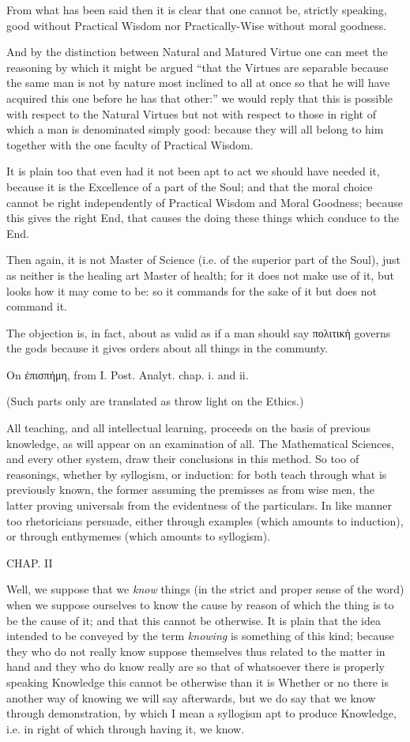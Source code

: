 From what has been said then it is clear that one cannot be, strictly speaking,
good without Practical Wisdom nor Practically-Wise without moral goodness.

And by the distinction between Natural and Matured Virtue one can meet the
reasoning by which it might be argued “that the Virtues are separable
because the same man is not by nature most inclined to all at once so that he
will have acquired this one before he has that other:” we would reply
that this is possible with respect to the Natural Virtues but not with respect
to those in right of which a man is denominated simply good: because they will
all belong to him together with the one faculty of Practical Wisdom.

It is plain too that even had it not been apt to act we should have needed it,
because it is the Excellence of a part of the Soul; and that the moral choice
cannot be right independently of Practical Wisdom and Moral Goodness; because
this gives the right End, that causes the doing these things which conduce to
the End.

Then again, it is not Master of Science (i.e. of the superior part of the
Soul), just as neither is the healing art Master of health; for it does not
make use of it, but looks how it may come to be: so it commands for the sake of
it but does not command it.

The objection is, in fact, about as valid as if a man should say
πολιτικὴ governs the gods because it
gives orders about all things in the communty.


On ἐπισπήμη, from I. Post. Analyt.
chap. i. and ii.

(Such parts only are translated as throw light on the Ethics.)

All teaching, and all intellectual learning, proceeds on the basis of previous
knowledge, as will appear on an examination of all. The Mathematical Sciences,
and every other system, draw their conclusions in this method. So too of
reasonings, whether by syllogism, or induction: for both teach through what is
previously known, the former assuming the premisses as from wise men, the
latter proving universals from the evidentness of the particulars. In like
manner too rhetoricians persuade, either through examples (which amounts to
induction), or through enthymemes (which amounts to syllogism).

CHAP. II

Well, we suppose that we \emph{know} things (in the strict and proper sense of
the word) when we suppose ourselves to know the cause by reason of which the
thing is to be the cause of it; and that this cannot be otherwise. It is plain
that the idea intended to be conveyed by the term \emph{knowing} is something
of this kind; because they who do not really know suppose themselves thus
related to the matter in hand and they who do know really are so that of
whatsoever there is properly speaking Knowledge this cannot be otherwise than
it is Whether or no there is another way of knowing we will say afterwards, but
we do say that we know through demonstration, by which I mean a syllogism apt
to produce Knowledge, i.e. in right of which through having it, we know.

